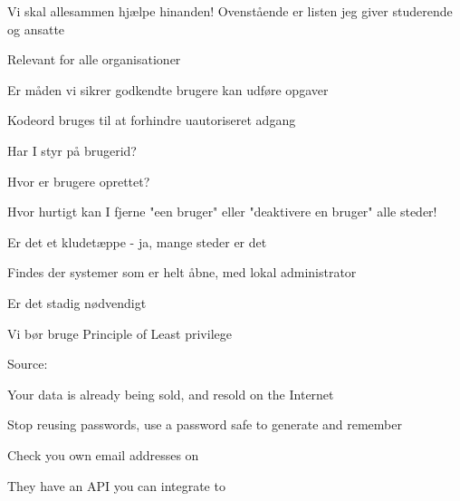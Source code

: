 \documentclass[Screen16to9,17pt]{foils}
\begin{document}
\vskip 5mm
\centerline{Vi skal allesammen hjælpe hinanden! Ovenstående er listen jeg giver studerende og ansatte}





\begin{list2}
\item Relevant for alle organisationer
\item Er måden vi sikrer godkendte brugere kan udføre opgaver
\item Kodeord bruges til at forhindre uautoriseret adgang
\item Har I styr på brugerid?
\item Hvor er brugere oprettet?
\item Hvor hurtigt kan I fjerne "een bruger" eller "deaktivere en bruger" alle steder!
\item Er det et kludetæppe - ja, mange steder er det
\end{list2}




\begin{list2}
\item Findes der systemer som er helt åbne, med lokal administrator
\item Er det stadig nødvendigt
\item Vi bør bruge Principle of Least privilege
\end{list2}




Source:




\begin{list1}
\item Your data is already being sold, and resold on the Internet
\item Stop reusing passwords, use a password safe to generate and remember
\item Check you own email addresses on 
\end{list1}

\centerline{They have an API you can integrate to}
\end{document}

